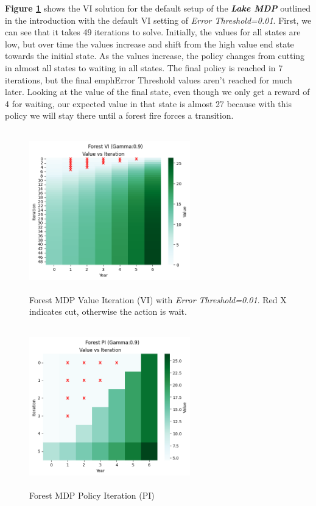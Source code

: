 \documentclass[letterpaper]{article} %
\begin{document}
\textbf{Figure \ref{fig:forest_vi}} shows the VI solution for the default setup of the  \textbf{\emph{Lake MDP}} outlined in the introduction with the default VI setting of \emph{Error Threshold=0.01}.  First, we can see that it takes 49 iterations to solve.  Initially, the values for all states are low, but over time the values increase and shift from the high value end state towards the initial state.  As the values increase, the policy changes from cutting in almost all states to waiting in all states.  The final policy is reached in 7 iterations, but the final emph{Error Threshold} values aren't reached for much later.  Looking at the value of the final state, even though we only get a reward of 4 for waiting, our expected value in that state is almost 27 because with this policy we will stay there until a forest fire forces a transition. 





\begin{figure}[!htb]
\centering
\includegraphics[width=2.75in, height=2.75in]{Figures/Forest_VI_Gamma_0_9_Value_vs_Iteration.png}
\caption{Forest MDP Value Iteration (VI) with \emph{Error Threshold=0.01}. Red X indicates cut, otherwise the action is wait. }
\label{fig:forest_vi}
\end{figure}


\begin{figure}[!htb]
\centering
\includegraphics[width=2.75in, height=2.75in]{Figures/Forest_PI_Gamma_0_9_Value_vs_Iteration.png}
\caption{Forest MDP Policy Iteration (PI) }
\label{fig:forest_pi}
\end{figure}
\end{document}
